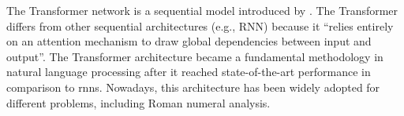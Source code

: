 

The Transformer network is a sequential model introduced by
\textcite{vaswani2017attention}. The Transformer differs
from other sequential architectures (e.g., RNN) because it
``relies entirely on an attention mechanism to draw global
dependencies between input and output''. The Transformer architecture became a fundamental methodology in natural language processing after it reached state-of-the-art performance in comparison to \glspl{rnn}. Nowadays, this architecture has been widely adopted for different problems, including Roman numeral analysis.
